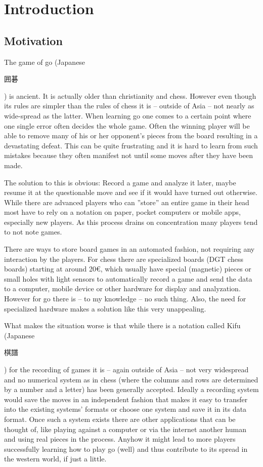 
\chapter{Introduction}
	\section{Motivation}
	The game of go (Japanese \begingroup\setmainfont{Droid Sans Japanese}\small\begin{CJK}{UTF8}{min}囲碁\end{CJK}\endgroup ) is ancient. It is actually older than christianity and chess. However even though its rules are simpler than the rules of chess it is -- outside of Asia -- not nearly as wide-spread as the latter. When learning go one comes to a certain point where one single error often decides the whole game. Often the winning player will be able to remove many of his or her opponent's pieces from the board resulting in a devastating defeat. This can be quite frustrating and it is hard to learn from such mistakes because they often manifest not until some moves after they have been made.

	The solution to this is obvious: Record a game and analyze it later, maybe resume it at the questionable move and see if it would have turned out otherwise. While there are advanced players who can ''store'' an entire game in their head most have to rely on a notation on paper, pocket computers or mobile apps, especially new players.	As this process drains on concentration many players tend to not note games.

	There are ways to store board games in an automated fashion, not requiring any interaction by the players. For chess there are specialized boards (DGT chess boards) starting at around 20€, which usually have special (magnetic) pieces or small holes with light sensors to automatically record a game and send the data to a computer, mobile	device or other hardware for display and analyzation. However for go there is -- to my knowledge -- no such thing. Also, the need for specialized hardware makes a solution like this very unappealing.

	What makes the situation worse is that while there is a notation called Kifu (Japanese \begingroup\setmainfont{Droid Sans Japanese}\small\begin{CJK}{UTF8}{min}棋譜\end{CJK}\endgroup ) for the recording of games it is -- again outside of Asia -- not very widespread and no numerical system as in chess (where the columns and rows are determined by a number and a letter) has been generally accepted. Ideally a recording system would save the moves in an independent fashion that makes it easy to transfer into the existing systems' formats or choose one system and save it in its data format. Once such a system exists there are other applications that can be thought of, like playing against a computer or via the internet another human and using real pieces in the process. Anyhow it might lead to more players successfully learning how to play go (well) and thus contribute to its spread in the western world, if just a little. %

